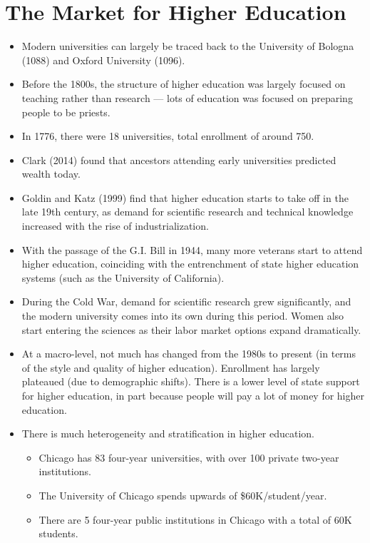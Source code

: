 \documentclass[10pt]{extarticle}
\begin{document}
  \section{The Market for Higher Education}%
  \begin{itemize}
    \item Modern universities can largely be traced back to the University of Bologna (1088) and Oxford University (1096).
    \item Before the 1800s, the structure of higher education was largely focused on teaching rather than research --- lots of education was focused on preparing people to be priests.
    \item In 1776, there were 18 universities, total enrollment of around 750.
    \item Clark (2014) found that ancestors attending early universities predicted wealth today.
    \item Goldin and Katz (1999) find that higher education starts to take off in the late 19th century, as demand for scientific research and technical knowledge increased with the rise of industrialization.
    \item With the passage of the G.I. Bill in 1944, many more veterans start to attend higher education, coinciding with the entrenchment of state higher education systems (such as the University of California).
    \item During the Cold War, demand for scientific research grew significantly, and the modern university comes into its own during this period. Women also start entering the sciences as their labor market options expand dramatically.
    \item At a macro-level, not much has changed from the 1980s to present (in terms of the style and quality of higher education). Enrollment has largely plateaued (due to demographic shifts). There is a lower level of state support for higher education, in part because people will pay a lot of money for higher education.
    \item There is much heterogeneity and stratification in higher education.
      \begin{itemize}
        \item Chicago has 83 four-year universities, with over 100 private two-year institutions.
        \item The University of Chicago spends upwards of \$60K/student/year.
        \item There are 5 four-year public institutions in Chicago with a total of 60K students.

\end{itemize}
\end{itemize}
\end{document}
